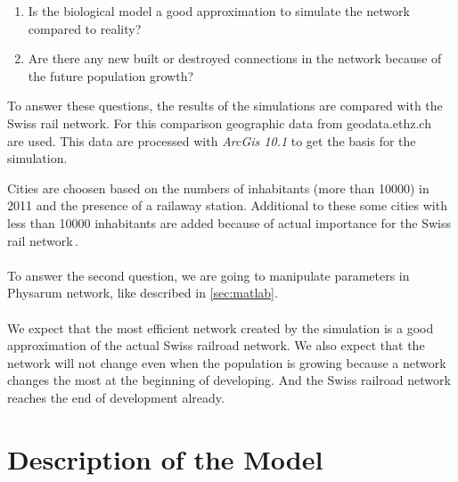 \documentclass[11pt]{scrartcl}
\begin{document}
\begin{enumerate}
	\item Is the biological model a good approximation to simulate the network compared to reality?
	\item Are there any new built or destroyed connections in the network because of the future population growth?
\end{enumerate}

To answer these questions, the results of the simulations are compared with the Swiss rail network. For this comparison geographic data from geodata.ethz.ch~\cite{gis_data} are used. This data are processed with \textit{ArcGis 10.1} to get the basis for the simulation.

Cities are choosen based on the numbers of inhabitants (more than 10000) in 2011 and the presence of a railaway station. Additional to these some cities with less than 10000 inhabitants are added because of actual importance for the Swiss rail network\,\cite{bfs}. ~\\
~\\
To answer the second question, we are going to manipulate parameters in Physarum network, like described  in \ref{sec:matlab}.\\
~\\
We expect that the most efficient network created by the simulation is a good approximation of the actual Swiss railroad network. We also expect that the network will not change even when the population is growing because a network changes the most at the beginning of developing. And the Swiss railroad network reaches the end of development already.




\section{Description of the Model}
\label{sec:description}
\end{document}
